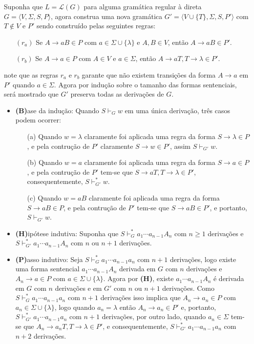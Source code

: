 \begin{prova}
	Suponha que $L = \mathcal{L}(G)$ para alguma gramática regular à direta $G = \langle V, \Sigma, S, P \rangle$, agora construa uma nova gramática $G' = \langle V \cup \{T\}, \Sigma, S, P'\rangle$ com $T \notin V$ e $P'$ sendo construído pelas seguintes regras:
	\begin{itemize}
		\item[$(r_a)$] Se  $A \rightarrow aB \in P$ com  $a \in \Sigma \cup \{\lambda\}$ e $A, B \in V$, então $A \rightarrow aB \in P'$.
		\item[$(r_b)$] Se  $A \rightarrow a \in P$ com  $A\in V$ e $a \in \Sigma$, então $A \rightarrow aT, T \rightarrow \lambda \in P'$.
	\end{itemize}
	note que as regras $r_a$ e $r_b$ garante que não existem transições da forma $A \rightarrow a$ em $P'$ quando $a \in \Sigma$. Agora por indução sobre o tamanho das formas sentenciais, será mostrado que $G'$ preserva todas as derivações de $G$.
	\begin{itemize}
		\item \textbf{(B)}ase da indução: Quando $S \vdash_{G} w$ em uma única derivação, três casos podem ocorrer:
		\begin{itemize}
			\item[(a)] Quando $w = \lambda$ claramente foi aplicada uma regra da forma $S \rightarrow \lambda \in P$, e pela contrução de $P'$ claramente $S \rightarrow w \in P'$, assim $S \vdash_{G'} w$.
			\item[(b)] Quando $w = a$ claramente foi aplicada uma regra da forma $S \rightarrow a \in P$, e pela contrução de $P'$ tem-se que $S \rightarrow aT, T \rightarrow \lambda \in P'$, consequentemente, $S \vdash_{G'}^* w$.
			\item[(c)]  Quando $w = aB$ claramente foi aplicada uma regra da forma $S \rightarrow aB \in P$, e pela contrução de $P'$ tem-se que $S \rightarrow aB \in P'$, e portanto, $S \vdash_{G'} w$.
		\end{itemize}
		\item \textbf{(H)}ipótese indutiva: Suponha que $S \vdash_{G}^* a_1\cdots a_{n-1}A_n$ com $n \geq 1$ derivações e $S \vdash_{G'}^* a_1\cdots a_{n-1}A_n$ com $n$ ou $n+1$ derivações.
		\item \textbf{(P)}asso indutivo: Seja $S \vdash_{G}^* a_1\cdots a_{n-1}a_n$ com $n + 1$ derivações, logo existe uma forma sentencial $a_1\cdots a_{n-1}A_n$ derivada em $G$ com $n$ derivações e $A_n \rightarrow a \in P$ com $a \in \Sigma \cup \{\lambda\}$. Agora por \textbf{(H)}, existe $a_1\cdots a_{n-1}A_n$ é derivada em $G$ com $n$ derivações e em $G'$ com $n$ ou $n+1$ derivações. Como $S \vdash_{G}^* a_1\cdots a_{n-1}a_n$ com $n + 1$ derivações isso implica que $A_n \rightarrow a_n \in P$ com $a_n \in \Sigma \cup \{\lambda\}$, logo quando $a_n = \lambda$ então $A_n \rightarrow a_n \in P'$ e, portanto,  $S \vdash_{G'}^* a_1\cdots a_{n-1}a_n$ com $n + 1$ derivações, por outro lado, quando $a_n \in \Sigma$ tem-se que $A_n \rightarrow a_nT, T \rightarrow \lambda \in P'$, e consequentemente,  $S \vdash_{G'}^* a_1\cdots a_{n-1}a_n$ com $n + 2$ derivações.

\end{itemize}
\end{prova}
